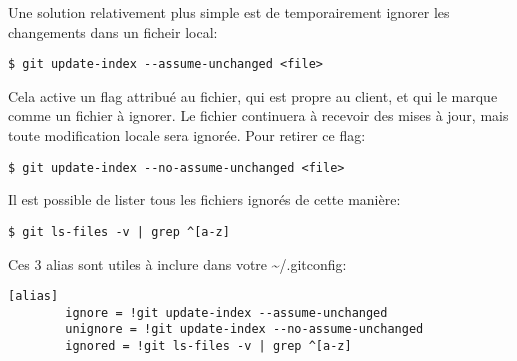 \documentclass{../../common/tufte-latex/tufte-handout}
\begin{document}
Une solution relativement plus simple est de temporairement ignorer les changements dans un ficheir local:
\begin{lstlisting}[style=BashInputStyle]
  $ git update-index --assume-unchanged <file>
\end{lstlisting}
Cela active un flag attribué au fichier, qui est propre au client, et qui le marque comme un fichier à ignorer.
Le fichier continuera à recevoir des mises à jour, mais toute modification locale sera ignorée.
Pour retirer ce flag:

\begin{lstlisting}[style=BashInputStyle]
  $ git update-index --no-assume-unchanged <file>
\end{lstlisting}

Il est possible de lister tous les fichiers ignorés de cette manière:

\begin{lstlisting}[style=BashInputStyle]
  $ git ls-files -v | grep ^[a-z]
\end{lstlisting}

Ces 3 alias sont utiles à inclure dans votre \textasciitilde/.gitconfig:

\begin{lstlisting}[style=BashInputStyle]
[alias]
        ignore = !git update-index --assume-unchanged 
        unignore = !git update-index --no-assume-unchanged
        ignored = !git ls-files -v | grep ^[a-z]
\end{lstlisting}



\end{document}
